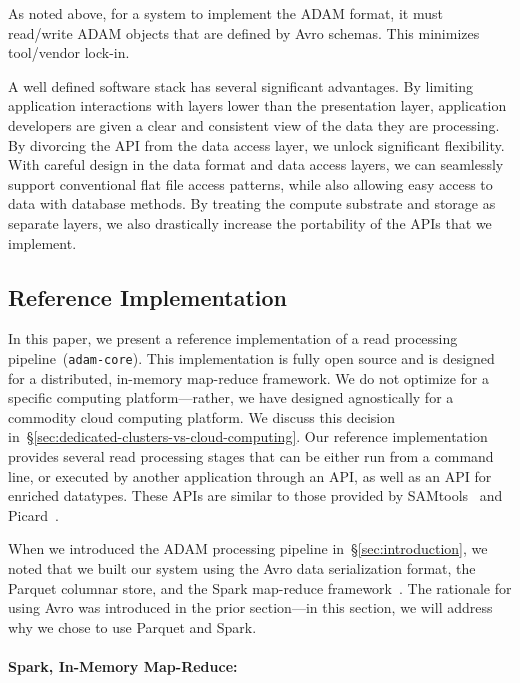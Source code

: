 \documentclass{bioinfo}
\begin{document}
As noted above, for a system to implement the ADAM format, it must read/write ADAM objects that are defined by Avro schemas. This minimizes
tool/vendor lock-in.

A well defined software stack has several significant advantages. By limiting application interactions with layers lower than the presentation layer,
application developers are given a clear and consistent view of the data they are processing. By divorcing the API from the data
access layer, we unlock significant flexibility. With careful design in the data format and data access layers, we can seamlessly
support conventional flat file access patterns, while also allowing easy access to data with database methods. By treating the
compute substrate and storage as separate layers, we also drastically increase the portability of the APIs that we implement.

\subsection{Reference Implementation}
\label{sec:reference-implementation}

In this paper, we present a reference implementation of a read processing pipeline~(\texttt{adam-core}). This implementation is fully open source
and is designed for a distributed, in-memory map-reduce framework. We do not optimize for a specific computing platform---rather, we have designed
agnostically for a commodity cloud computing platform. We discuss this decision in~\S\ref{sec:dedicated-clusters-vs-cloud-computing}. Our reference
implementation provides several read processing stages that can be either run from a command line, or executed by another application through
an API, as well as an API for enriched datatypes. These APIs are similar to those provided by SAMtools~\citep{li09} and Picard~\citep{picard}.

When we introduced the ADAM processing pipeline in~\S\ref{sec:introduction}, we noted that we built our system using the Avro data serialization
format, the Parquet columnar store, and the Spark map-reduce framework~\citep{avro, parquet, zaharia10}. The rationale for using Avro was
introduced in the prior section---in this section, we will address why we chose to use Parquet and Spark.

\paragraph{Spark, In-Memory Map-Reduce:}
\label{sec:spark}
\end{document}
